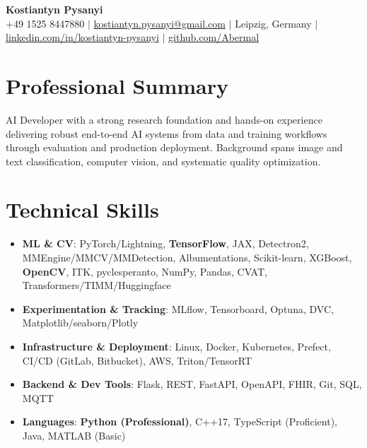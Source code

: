 \documentclass[letterpaper,10pt]{article}
\newcommand{\resumeItem}[1]{
    \item\small{#1}\vspace{-0.5pt}
}
\newcommand{\resumeSubHeadingList}{\begin{itemize}[leftmargin=0.15in, label={}]\vspace{-2pt}}
\newcommand{\resumeSubHeadingListEnd}{\end{itemize}}
\begin{document}
\begin{center}
  \textbf{\Huge Kostiantyn Pysanyi}\vspace{4pt} \\
  \small +49 1525 8447880 $|$ \href{mailto:kostiantyn.pysanyi@gmail.com}{kostiantyn.pysanyi@gmail.com} $|$ Leipzig, Germany $|$
  \href{https://www.linkedin.com/in/kostiantyn-pysanyi/}{linkedin.com/in/kostiantyn-pysanyi} $|$ \href{https://github.com/Abermal}{github.com/Abermal}
\end{center}




\section{Professional Summary}
AI Developer with a strong research foundation and hands-on experience delivering robust end-to-end AI systems from data and training workflows through evaluation and production deployment. Background spans image and text classification, computer vision, and systematic quality optimization.

\section{Technical Skills}
\resumeSubHeadingList
  \resumeItem{\textbf{ML \& CV}: PyTorch/Lightning, \textbf{TensorFlow}, JAX, Detectron2, MMEngine/MMCV/MMDetection, Albumentations, Scikit-learn, XGBoost, \textbf{OpenCV}, ITK, pyclesperanto, NumPy, Pandas, CVAT, Transformers/TIMM/Huggingface}
  \resumeItem{\textbf{Experimentation \& Tracking}: MLflow, Tensorboard, Optuna, DVC, Matplotlib/seaborn/Plotly}
  \resumeItem{\textbf{Infrastructure \& Deployment}: Linux, Docker, Kubernetes, Prefect, CI/CD (GitLab, Bitbucket), AWS, Triton/TensorRT}
  \resumeItem{\textbf{Backend \& Dev Tools}: Flask, REST, FastAPI, OpenAPI, FHIR, Git, SQL, MQTT}
  \resumeItem{\textbf{Languages}: \textbf{Python (Professional)}, C++17, TypeScript (Proficient), Java, MATLAB (Basic)}
\resumeSubHeadingListEnd
\end{document}
